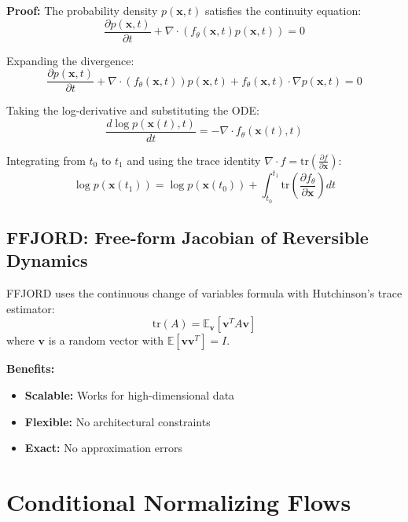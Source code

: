 \textbf{Proof:} The probability density $p(\mathbf{x}, t)$ satisfies the continuity equation:
\begin{equation}
    \frac{\partial p(\mathbf{x}, t)}{\partial t} + \nabla \cdot (f_\theta(\mathbf{x}, t) p(\mathbf{x}, t)) = 0
\end{equation}

Expanding the divergence:
\begin{equation}
    \frac{\partial p(\mathbf{x}, t)}{\partial t} + \nabla \cdot (f_\theta(\mathbf{x}, t)) p(\mathbf{x}, t) + f_\theta(\mathbf{x}, t) \cdot \nabla p(\mathbf{x}, t) = 0
\end{equation}

Taking the log-derivative and substituting the ODE:
\begin{equation}
    \frac{d \log p(\mathbf{x}(t), t)}{dt} = -\nabla \cdot f_\theta(\mathbf{x}(t), t)
\end{equation}

Integrating from $t_0$ to $t_1$ and using the trace identity $\nabla \cdot f = \text{tr}\left(\frac{\partial f}{\partial \mathbf{x}}\right)$:
\begin{equation}
    \log p(\mathbf{x}(t_1)) = \log p(\mathbf{x}(t_0)) + \int_{t_0}^{t_1} \text{tr}\left(\frac{\partial f_\theta}{\partial \mathbf{x}}\right) dt
\end{equation}

\subsection{FFJORD: Free-form Jacobian of Reversible Dynamics}

FFJORD uses the continuous change of variables formula with Hutchinson's trace estimator:
\begin{equation}
    \text{tr}(A) = \mathbb{E}_{\mathbf{v}}[\mathbf{v}^T A \mathbf{v}]
\end{equation}
where $\mathbf{v}$ is a random vector with $\mathbb{E}[\mathbf{v}\mathbf{v}^T] = I$.

\textbf{Benefits:}
\begin{itemize}
    \item \textbf{Scalable:} Works for high-dimensional data
    \item \textbf{Flexible:} No architectural constraints
    \item \textbf{Exact:} No approximation errors
\end{itemize}

\section{Conditional Normalizing Flows}

